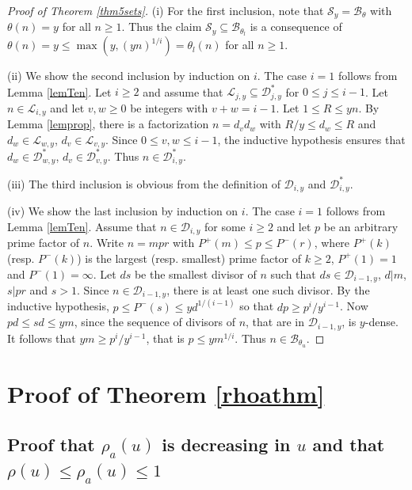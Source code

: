 \documentclass[11pt]{amsart}
\begin{document}
\begin{proof}[Proof of Theorem \ref{thm5sets}]

(i) For the first inclusion, note that $\mathcal{S}_y = \mathcal{B}_\theta$ with $\theta(n)=y$ for all $n\ge 1$. 
Thus the claim $\mathcal{S}_y\subseteq \mathcal{B}_{\theta_l}$
is a consequence of $\theta(n) = y \le  \max(y, (yn)^{1/i})=\theta_l(n)$ for all $n\ge 1$. 

(ii) We show the second inclusion by induction on $i$. 
The case $i=1$ follows from Lemma \ref{lemTen}. 
Let $i\ge 2$ and assume that  $\mathcal{L}_{j,y} \subseteq  \mathcal{D}^*_{j,y} $ for $0\le j \le i-1$. 
Let $n\in \mathcal{L}_{i,y} $ and let $v,w \ge 0$ be integers with $v+w=i-1$. Let $1\le R \le yn$.  
By Lemma \ref{lemprop}, there is a factorization
$n=d_v d_w$ with $R/y \le d_w \le R$ and $d_w \in \mathcal{L}_{w,y}$, $d_v \in \mathcal{L}_{v,y}$.
Since $0\le v, w \le i-1$, the inductive hypothesis ensures that $d_w \in \mathcal{D}^*_{w,y}$, $d_v \in \mathcal{D}^*_{v,y}$. Thus $n\in \mathcal{D}^*_{i,y}$.

(iii) The third inclusion is obvious from the definition of $\mathcal{D}_{i,y}$ and $ \mathcal{D}^*_{i,y}$. 

(iv) We show the last inclusion by induction on $i$. 
The case $i=1$ follows from Lemma \ref{lemTen}. 
 Assume that $n\in \mathcal{D}_{i,y}$ for some $i\ge 2$ and let $p$ be an arbitrary prime factor of $n$. 
Write $n=m p r$ with $P^+(m) \le p \le P^-(r)$, where $P^+(k)$ (resp. $P^-(k)$) is the largest (resp. smallest) prime factor of $k\ge 2$, $P^+(1)=1$ and $P^-(1)=\infty$.
Let $ds$ be the smallest divisor of $n$ such that $ds \in \mathcal{D}_{i-1,y}$, $d|m$, $s|pr$ and $s>1$.
Since $n\in \mathcal{D}_{i-1,y}$, there is at least one such divisor. 
By the inductive hypothesis, $p\le P^-(s) \le y d^{1/(i-1)}$ so that $dp \ge p^i/y^{i-1}$. Now $pd \le sd \le ym$, since the sequence of divisors of 
$n$, that are in $\mathcal{D}_{i-1,y}$, is $y$-dense. It follows that
$ym \ge  p^i/y^{i-1}$, that is $p \le y m^{1/i}$. Thus $n\in \mathcal{B}_{\theta_u}$.
\end{proof}


\section{Proof of Theorem \ref{rhoathm}}\label{secrhoa}

\subsection{Proof that $\rho_a(u)$ is decreasing in $u$ and that $\rho(u)\le \rho_a(u)\le 1$}
\end{document}
